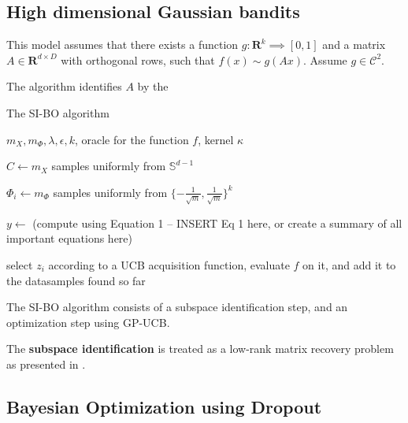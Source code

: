 \subsection{High dimensional Gaussian bandits}

\citep{Djolonga2013} This model assumes that there exists a function $g : \mathbf{R}^k \implies [0, 1]$ and a matrix $A \in \mathbf{R}^{d \times D}$ with orthogonal rows, such that $f(x) \sim g(Ax) $. Assume $g \in \mathcal{C}^2$. 

The algorithm identifies $A$ by the 

\begin{algorithm}
\caption{The SI-BO algorithm \citep{Djolonga2013}}

\begin{algorithmic} 
\REQUIRE $m_X, m_{\Phi}, \lambda, \epsilon, k$, oracle for the function $f$, kernel $\kappa$ 

\STATE $C \leftarrow m_X $ samples uniformly from $\mathbb{S}^{d-1}$

\STATE $\Phi_i \leftarrow m_{\Phi}$ samples uniformly from $\{ -\frac{1}{\sqrt{m}}, \frac{1}{\sqrt{m}} \}^k$
\ENDFOR

\STATE $ y \leftarrow $ (compute using Equation 1 -- INSERT Eq 1 here, or create a summary of all important equations here)

\STATE select $z_i$ according to a UCB acquisition function, evaluate $f$ on it, and add it to the datasamples found so far

\end{algorithmic}

\end{algorithm}

The SI-BO algorithm consists of a subspace identification step, and an optimization step using GP-UCB.


The \textbf{subspace identification} is treated as a low-rank matrix recovery problem as presented in \citep{CevherSubspaceIdentificationKrause}.



\subsection{Bayesian Optimization using Dropout}

